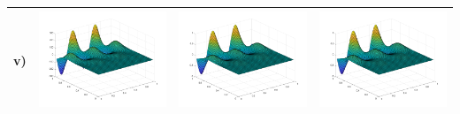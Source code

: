 \documentclass[11pt]{article}
\theoremstyle{definition}
\theoremstyle{remark}
\theoremstyle{plain}
\begin{document}
\begin{center}
\begin{tabular}{|>{\centering\arraybackslash}r|m{4.3cm}|m{4.3cm}|m{4.3cm}|}
    v)&\includegraphics[width=\linewidth]{../Figures/poisson_rhs_5.png}&\includegraphics[width=\linewidth]{../Figures/poisson_actual_5.png}&\includegraphics[width=\linewidth]{../Figures/poisson_approx_5.png}\\\hline
  \end{tabular}
\end{center}
\end{document}
